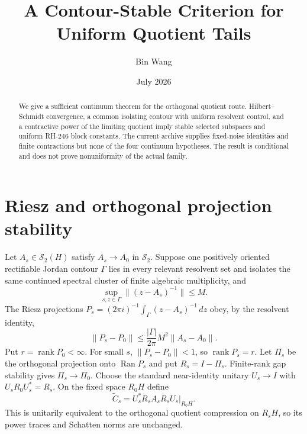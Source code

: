 \documentclass[11pt]{article}
\title{A Contour-Stable Criterion for Uniform Quotient Tails}\author{Bin Wang}\date{July 2026}
\begin{document}
\maketitle
\begin{abstract}
We give a sufficient continuum theorem for the orthogonal quotient route.
Hilbert--Schmidt convergence, a common isolating contour with uniform
resolvent control, and a contractive power of the limiting quotient imply
stable selected subspaces and uniform RH-246 block constants.  The current
archive supplies fixed-noise identities and finite contractions but none of
the four continuum hypotheses.  The result is conditional and does not prove
nonuniformity of the actual family.
\end{abstract}

\section{Riesz and orthogonal projection stability}
Let $A_s\in\mathcal S_2(H)$ satisfy $A_s\to A_0$ in $\mathcal S_2$.
Suppose one positively oriented rectifiable Jordan contour $\Gamma$ lies in
every relevant resolvent set and isolates the same continued spectral cluster
of finite algebraic multiplicity,
and
\[
 \sup_{s,z\in\Gamma}\|(z-A_s)^{-1}\|\le M.
\]
The Riesz projections
$P_s=(2\pi i)^{-1}\int_\Gamma(z-A_s)^{-1}\,dz$ obey, by the resolvent
identity,
\begin{equation}
 \|P_s-P_0\|\le\frac{|\Gamma|}{2\pi}M^2\|A_s-A_0\|.
 \label{eq:riesz}
\end{equation}
Put $r=\operatorname{rank}P_0<\infty$.  For small $s$,
$\|P_s-P_0\|<1$, so $\operatorname{rank}P_s=r$.  Let $\Pi_s$ be the
orthogonal projection onto $\operatorname{Ran}P_s$ and put $R_s=I-\Pi_s$.
Finite-rank gap stability gives $\Pi_s\to\Pi_0$.  Choose the standard
near-identity unitary $U_s\to I$ with $U_sR_0U_s^*=R_s$.  On the fixed space
$R_0H$ define
\[
 \widetilde C_s=
 U_s^*R_sA_sR_sU_s\big|_{R_0H}.
\]
This is unitarily equivalent to the orthogonal quotient compression on
$R_sH$, so its power traces and Schatten norms are unchanged.
\end{document}
